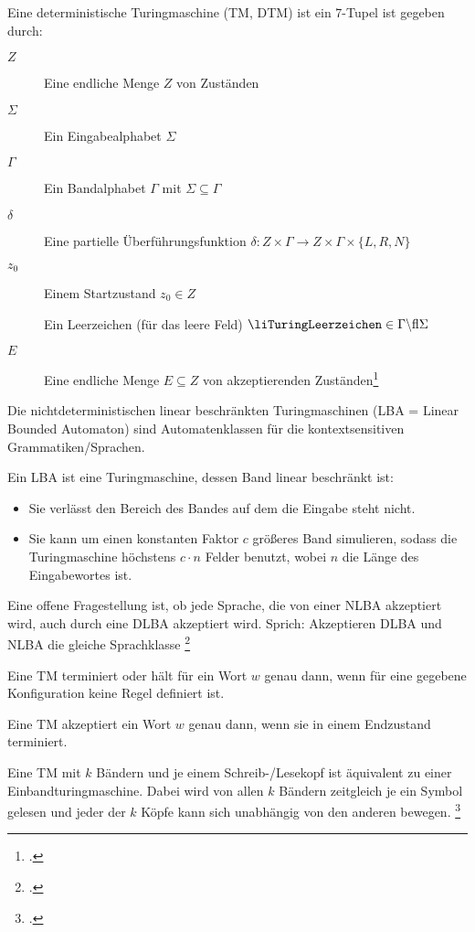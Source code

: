 \documentclass{lehramt-informatik-haupt}
\begin{document}
\noindent
Eine deterministische Turingmaschine (TM, DTM) ist ein 7-Tupel
\liTuringMaschine{} ist gegeben durch:

\begin{description}
\item[$Z$]
Eine endliche Menge $Z$ von Zuständen

\item[$\Sigma$]
Ein Eingabealphabet $\Sigma$

\item[$\Gamma$]
Ein Bandalphabet $\Gamma$ mit $\Sigma \subseteq\Gamma$

\item[$\delta$]
Eine partielle Überführungsfunktion
$\delta : Z \times \Gamma \rightarrow Z \times \Gamma \times \{ L, R, N \}$

\item[$z_0$]
Einem Startzustand $z_0 \in Z$

\item[\liTuringLeerzeichen]
Ein Leerzeichen (für das leere Feld) $\liTuringLeerzeichen \in \Gamma \string\ \Sigma$

\item[$E$]
Eine endliche Menge $E \subseteq Z$ von
akzeptierenden Zuständen\footcite[Seite 21]{theo:fs:3}
\end{description}

Die nichtdeterministischen linear beschränkten Turingmaschinen
(LBA = Linear Bounded Automaton) sind Automatenklassen für die
kontextsensitiven Grammatiken/Sprachen.

Ein LBA ist eine Turingmaschine, dessen Band linear beschränkt ist:

\begin{itemize}
\item[Definition 1]

Sie verlässt den Bereich des Bandes auf dem die Eingabe steht nicht.

\item[Definition 2]

Sie kann um einen konstanten Faktor $c$ größeres Band simulieren, sodass
die Turingmaschine höchstens $c \cdot n$ Felder benutzt, wobei $n$ die
Länge des Eingabewortes ist.
\end{itemize}

Eine offene Fragestellung ist, ob jede Sprache, die von einer NLBA
akzeptiert wird, auch durch eine DLBA akzeptiert wird. Sprich:
Akzeptieren DLBA und NLBA die gleiche Sprachklasse
\footcite[Seite 10]{theo:fs:3}

Eine TM terminiert oder hält für ein Wort $w$ genau dann, wenn für
eine gegebene Konfiguration keine Regel definiert ist.

Eine TM akzeptiert ein Wort $w$ genau dann, wenn sie in einem
Endzustand terminiert.

Eine TM mit $k$ Bändern und je einem Schreib-/Lesekopf ist
äquivalent zu einer Einbandturingmaschine. Dabei wird von allen $k$
Bändern zeitgleich je ein Symbol gelesen und jeder der $k$ Köpfe
kann sich unabhängig von den anderen bewegen.
\footcite[Seite 26]{theo:fs:3}

\literatur
\end{document}
